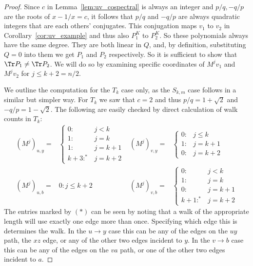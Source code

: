 \begin{proof}
Since $c$ in Lemma~\ref{lem:uv_cospectral} is always an integer and $p/q, -q/p$ are the roots of $x-1/x= c$, it follows that $p/q$ and $-q/p$ are always quadratic integers that are each others' conjugates. This conjugation maps $v_1$ to $v_2$ in Corollary~\ref{cor:uv_example} and thus also $P^K_1$ to $P^K_2$. So these polynomials always have the same degree. They are both linear in $Q$, and, by definition, substituting $Q=0$ into them we get $P_1$ and $P_2$ respectively. So it is sufficient to show that $\Tr P_1 \neq \Tr P_2$. We will do so by examining specific coordinates of $M^j v_1$ and $M^j v_2$ for $j \leq k+2 = n/2$. 

We outline the computation for the $T_k$ case only, as the $S_{k,m}$ case follows in a similar but simpler way. For $T_k$ we saw that $c=2$ and thus $p/q = 1+\sqrt{2}$ and $-q/p = 1-\sqrt{2}$. The following are easily checked by direct calculation of walk counts in $T_k$:
\begin{align*}
(M^j)_{u,y} =& \left\{ \begin{array}{cl} 0 :& j < k \\ 1:& j=k \\ 1 :& j= k+1 \\ k+3 :^*& j =k+2 \end{array} \right. &
(M^j)_{v,y} =& \left\{ \begin{array}{cl} 0 :& j \leq k \\ 1 :& j= k+1 \\ 0 :& j =k+2 \end{array} \right. \\
(M^j)_{u,b} =& 0 : j \leq k+2 &
(M^j)_{v,b} =& \left\{ \begin{array}{cl} 0 :& j < k \\ 1:& j=k \\ 0 :& j= k+1 \\ k+1 :^*& j =k+2 \end{array} \right. 
\end{align*}
The entries marked by $(*)$ can be seen by noting that a walk of the appropriate length will use exactly one edge more than once. Specifying which edge this is determines the walk. In the $u \to y$ case this can be any of the edges on the $uy$ path, the $xz$ edge, or any of the other two edges incident to $y$. In the $v \to b$ case this can be any of the edges on the $va$ path, or one of the other two edges incident to $a$. 


\end{proof}
